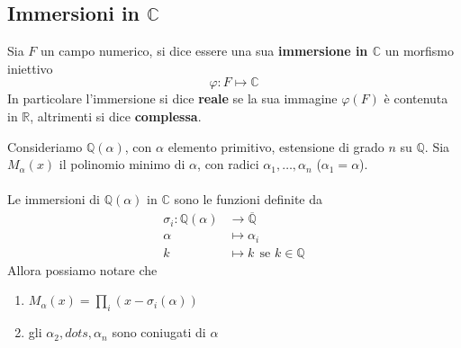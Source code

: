 \subsection{Immersioni in $\mathbb{C}$}
\begin{definizione}
	Sia $F$ un campo numerico, si dice essere una sua \textbf{immersione in $\mathbb{C}$} un morfismo iniettivo 
	\begin{equation*}
	\varphi: F \longmapsto \mathbb{C}
	\end{equation*}
	In particolare l'immersione si dice \textbf{reale} se la sua immagine $\varphi(F)$ è contenuta in $\mathbb{R}$, altrimenti si dice \textbf{complessa}.
\end{definizione}
\begin{osservazione}
	Consideriamo $\mathbb{Q}(\alpha)$, con $\alpha$ elemento primitivo, estensione di grado $n$ su $\mathbb{Q}$. Sia $M_\alpha(x)$ il polinomio minimo di $\alpha$, con radici $\alpha_1,\dots,\alpha_n$ ($\alpha_1=\alpha$). \\ \\ Le immersioni di $\mathbb{Q}(\alpha)$ in $\mathbb{C}$ sono le funzioni definite da 
	\begin{align*}
	\sigma_i:\mathbb{Q}(\alpha)&\longrightarrow \overline{\mathbb{Q}}\\
	\alpha&\longmapsto\alpha_i\\
	k&\longmapsto k \ \ \text{se $k\in\mathbb{Q}$}
	\end{align*}
	Allora possiamo notare che 
	\begin{enumerate}
		\item $M_\alpha(x)=\prod_i\left(x-\sigma_i(\alpha)\right)$
		\item gli $\alpha_2,dots,\alpha_n$ sono coniugati di $\alpha$ %
	\end{enumerate}
\end{osservazione}
